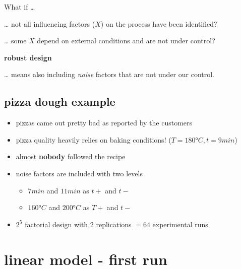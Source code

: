\documentclass[
  a4paper,
]{scrbook}
\providecommand{\tightlist}{%
  \setlength{\itemsep}{0pt}\setlength{\parskip}{0pt}}\usepackage{longtable,booktabs,array}
\begin{document}
What if \ldots{}

\ldots{} not all influencing factors (\(X\)) on the process have been
identified?

\ldots{} some \(X\) depend on external conditions and are not under
control?

\textbf{robust design}

\ldots{} means also including \emph{noise} factors that are not under
our control.

\subsection{pizza dough example}\label{pizza-dough-example-1}

\begin{itemize}
\item
  pizzas came out pretty bad as reported by the customers
\item
  pizza quality heavily relies on baking conditions!
  (\(T = 180°C, t = 9min\))
\item
  almost \textbf{nobody} followed the recipe
\item
  noise factors are included with two levels

  \begin{itemize}
  \tightlist
  \item
    \(7min\) and \(11min\) as \(t+\) and \(t-\)
  \item
    \(160°C\) and \(200°C\) as \(T+\) and \(t-\)
  \end{itemize}
\item
  \(2^5\) factorial design with \(2\) replications \(=64\) experimental
  runs
\end{itemize}

\section{linear model - first run}\label{linear-model---first-run}
\end{document}
